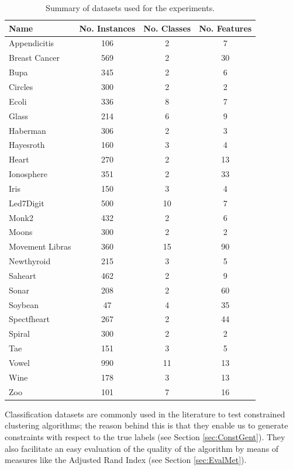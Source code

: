 \documentclass[review]{elsarticle}
\begin{document}
\begin{table}[!h]
	\centering
	\small
	\begin{tabular}{l c c c}
		\hline
		Name & No. Instances & No. Classes & No. Features \\
		\hline
		Appendicitis & 106 & 2 & 7 \\
		Breast Cancer & 569 & 2 & 30 \\
		Bupa & 345 & 2 & 6 \\
		Circles & 300 & 2 & 2 \\
		Ecoli & 336 & 8 & 7 \\
		Glass & 214 & 6 & 9 \\
		Haberman & 306 & 2 & 3 \\
		Hayesroth & 160 & 3 & 4 \\
		Heart & 270 & 2 & 13 \\
		Ionosphere & 351 & 2 & 33 \\
		Iris & 150 & 3 & 4 \\
		Led7Digit & 500 & 10 & 7 \\
		Monk2 & 432 & 2 & 6 \\
		Moons & 300 & 2 & 2 \\
		Movement Libras & 360 & 15 & 90 \\
		Newthyroid & 215 & 3 & 5 \\
		Saheart & 462 & 2 & 9 \\
		Sonar & 208 & 2 & 60 \\
		Soybean & 47 & 4 & 35 \\
		Spectfheart & 267 & 2 & 44 \\
		Spiral & 300 & 2 & 2 \\
		Tae & 151 & 3 & 5 \\
		Vowel & 990 & 11 & 13 \\
		Wine & 178 & 3 & 13 \\
		Zoo & 101 & 7 & 16 \\
		\hline

	\end{tabular}%
	\caption{Summary of datasets used for the experiments.}
	\label{tab:datasets}
\end{table}

Classification datasets are commonly used in the literature to test constrained clustering algorithms; the reason behind this is that they enable us to generate constraints with respect to the true labels (see Section \ref{sec:ConstGent}). They also facilitate an easy evaluation of the quality of the algorithm by means of measures like the Adjusted Rand Index (see Section \ref{sec:EvalMet}).
\end{document}
